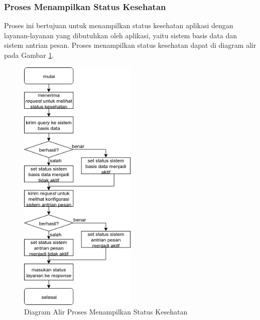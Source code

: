 \subsubsection{Proses Menampilkan Status Kesehatan}
\par Proses ini bertujuan untuk menampilkan status kesehatan aplikasi dengan layanan-layanan yang dibutuhkan oleh aplikasi, yaitu sistem basis data dan sistem antrian pesan. Proses menampilkan status kesehatan dapat di diagram alir pada Gambar \ref{fc:kesehatan}.
\begin{figure}[H]
	\centering\includegraphics[width=0.5\textwidth]{bab3/img/flowchart-menampilkan_kesehatan.jpg}
	\caption{Diagram Alir Proses Menampilkan Status Kesehatan} \label{fc:kesehatan}
\end{figure}
\clearpage

